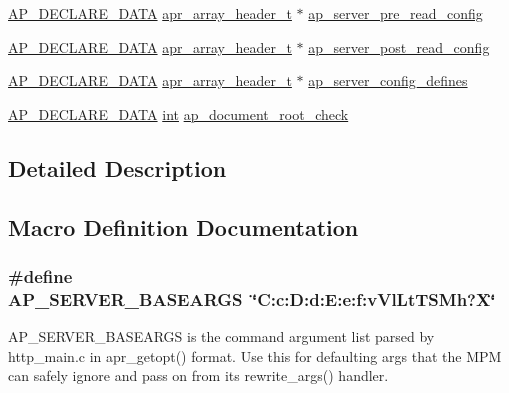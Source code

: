 \begin{DoxyCompactItemize}
\item 
\hyperlink{ap__config_8h_a0bb4c3adf74510a0dcdad5b125725fe0}{A\+P\+\_\+\+D\+E\+C\+L\+A\+R\+E\+\_\+\+D\+A\+TA} \hyperlink{structapr__array__header__t}{apr\+\_\+array\+\_\+header\+\_\+t} $\ast$ \hyperlink{group__APACHE__CORE__MAIN_gad3ee3481f3fb8dd80854e22780fd7ef3}{ap\+\_\+server\+\_\+pre\+\_\+read\+\_\+config}
\item 
\hyperlink{ap__config_8h_a0bb4c3adf74510a0dcdad5b125725fe0}{A\+P\+\_\+\+D\+E\+C\+L\+A\+R\+E\+\_\+\+D\+A\+TA} \hyperlink{structapr__array__header__t}{apr\+\_\+array\+\_\+header\+\_\+t} $\ast$ \hyperlink{group__APACHE__CORE__MAIN_ga02ae1d9605521ea5e5485bc183f039ad}{ap\+\_\+server\+\_\+post\+\_\+read\+\_\+config}
\item 
\hyperlink{ap__config_8h_a0bb4c3adf74510a0dcdad5b125725fe0}{A\+P\+\_\+\+D\+E\+C\+L\+A\+R\+E\+\_\+\+D\+A\+TA} \hyperlink{structapr__array__header__t}{apr\+\_\+array\+\_\+header\+\_\+t} $\ast$ \hyperlink{group__APACHE__CORE__MAIN_ga6402302ec770b2decb574b57bbbe0fb8}{ap\+\_\+server\+\_\+config\+\_\+defines}
\item 
\hyperlink{ap__config_8h_a0bb4c3adf74510a0dcdad5b125725fe0}{A\+P\+\_\+\+D\+E\+C\+L\+A\+R\+E\+\_\+\+D\+A\+TA} \hyperlink{pcre_8txt_a42dfa4ff673c82d8efe7144098fbc198}{int} \hyperlink{group__APACHE__CORE__MAIN_ga4ba96fbbb8c0c80ff8805b8cfae4fbfd}{ap\+\_\+document\+\_\+root\+\_\+check}
\end{DoxyCompactItemize}


\subsection{Detailed Description}


\subsection{Macro Definition Documentation}
\subsubsection[{\texorpdfstring{A\+P\+\_\+\+S\+E\+R\+V\+E\+R\+\_\+\+B\+A\+S\+E\+A\+R\+GS}{AP_SERVER_BASEARGS}}]{\setlength{\rightskip}{0pt plus 5cm}\#define A\+P\+\_\+\+S\+E\+R\+V\+E\+R\+\_\+\+B\+A\+S\+E\+A\+R\+GS~\char`\"{}C\+:c\+:\+D\+:d\+:\+E\+:e\+:f\+:v\+Vl\+Lt\+T\+S\+Mh?{\bf X}\char`\"{}}\hypertarget{group__APACHE__CORE__MAIN_gae239400e72c98b1b05b6c656d36ee03c}{}\label{group__APACHE__CORE__MAIN_gae239400e72c98b1b05b6c656d36ee03c}
A\+P\+\_\+\+S\+E\+R\+V\+E\+R\+\_\+\+B\+A\+S\+E\+A\+R\+GS is the command argument list parsed by http\+\_\+main.\+c in apr\+\_\+getopt() format. Use this for default\textquotesingle{}ing args that the M\+PM can safely ignore and pass on from its rewrite\+\_\+args() handler. 

